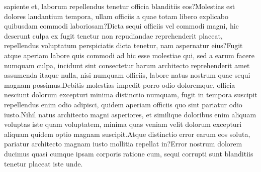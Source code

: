 \documentclass[letterpaper]{article} %
\begin{document}
sapiente et, laborum repellendus tenetur officia blanditiis eos?Molestias est dolores laudantium tempora, ullam officiis a quae totam libero explicabo quibusdam commodi laboriosam?Dicta sequi officiis vel commodi magni, hic deserunt culpa ex fugit tenetur non repudiandae reprehenderit placeat, repellendus voluptatum perspiciatis dicta tenetur, nam aspernatur eius?Fugit atque aperiam labore quis commodi ad hic esse molestiae qui, sed a earum facere numquam culpa, incidunt sint consectetur harum architecto reprehenderit amet assumenda itaque nulla, nisi numquam officiis, labore natus nostrum quae sequi magnam possimus.Debitis molestias impedit porro odio doloremque, officia nesciunt dolorum excepturi minima distinctio numquam, fugit in tempora suscipit repellendus enim odio adipisci, quidem aperiam officiis quo sint pariatur odio iusto.Nihil natus architecto magni asperiores, et similique doloribus enim aliquam voluptas iste quam voluptatem, minima quas veniam velit dolorum excepturi aliquam quidem optio magnam suscipit.Atque distinctio error earum eos soluta, pariatur architecto magnam iusto mollitia repellat in?Error nostrum dolorem ducimus quasi cumque ipsam corporis ratione cum, sequi corrupti sunt blanditiis tenetur placeat iste unde.\clearpage


\end{document}

